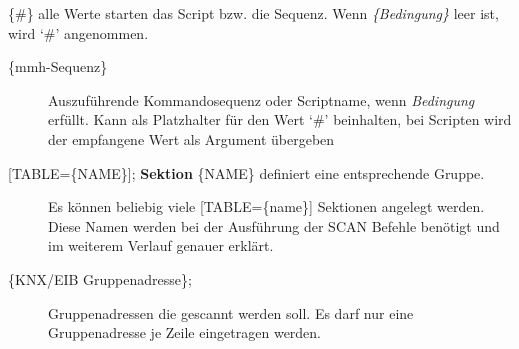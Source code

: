 \documentclass[letterpaper,10pt,english]{sphinxmanual}
\begin{document}
\{\#\}     alle Werte starten das Script bzw. die Sequenz. Wenn \emph{\{Bedingung\}} leer ist, wird `\#' angenommen.
\begin{description}
\item[{\{mmh-Sequenz\}}] \leavevmode
Auszuführende Kommandosequenz oder Scriptname, wenn \emph{Bedingung} erfüllt. Kann als Platzhalter für den Wert `\#'        beinhalten, bei Scripten wird der empfangene Wert als   Argument übergeben

\item[{{[}TABLE=\{NAME\}{]}; \textbf{Sektion} \{NAME\} definiert eine entsprechende Gruppe.}] \leavevmode
Es können beliebig viele {[}TABLE=\{name\}{]} Sektionen angelegt werden.
Diese Namen werden bei der Ausführung der SCAN Befehle benötigt und im weiterem Verlauf genauer erklärt.

\item[{\{KNX/EIB Gruppenadresse\};}] \leavevmode
Gruppenadressen die gescannt werden soll. Es darf nur eine Gruppenadresse je Zeile eingetragen werden.

\end{description}
\end{document}
